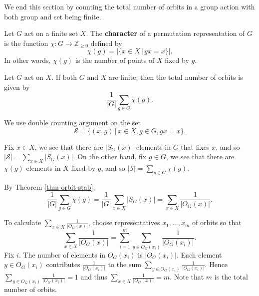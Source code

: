 We end this section by counting the total number of orbits in a group action with both group and set being finite.
\begin{definition}
	Let $G$ act on a finite set $X$. The \textbf{character} of a permutation representation of $G$ is the function $\chi:G\rightarrow \mathbb{Z}_{\geq 0}$ defined by
	\begin{equation*}
		\chi(g) = |\{x\in X\,|\, gx = x\}|.
	\end{equation*}
	In other words, $\chi(g)$ is the number of points of $X$ fixed by $g$.
\end{definition}
\begin{theorem} \label{thm-burnside-lemma}
	Let $G$ act on $X$. If both $G$ and $X$ are finite, then the total number of orbits is given by
	\begin{equation*}
		\frac{1}{|G|}\sum_{g\in G}\chi(g).
	\end{equation*}
\end{theorem}
\begin{sketch}
	We use double counting argument on the set 
	$$\mathcal{S} = \{(x,g)\,|\, x\in X,g\in G,gx = x\}.$$
	
	Fix $x\in X$, we see that there are $|S_G(x)|$ elements in $G$ that fixes $x$, and so $|\mathcal{S}| = \sum_{x\in X}|S_G(x)|$. On the other hand, fix $g\in G$, we see that there are $\chi(g)$ elements in $X$ fixed by $g$, and so 
	$|\mathcal{S}| = \sum_{g\in G}\chi(g)$.
	
	By Theorem \ref{thm-orbit-stab}, 
	\begin{equation*}
		\frac{1}{|G|} \sum_{g\in G}\chi(g) = \frac{1}{|G|} \sum_{x\in X}|S_G(x)| =  \sum_{x\in X} \frac{1}{|O_G(x)|}.
	\end{equation*}
	
To calculate $ \sum_{x\in X} \frac{1}{|O_G(x)|}$, choose representatives $x_1,\dots, x_m$ of orbits so that
\begin{equation*}
	\sum_{x\in X} \frac{1}{|O_G(x)|} = \sum_{i=1}^m\sum_{y\in O_G(x_i)} \frac{1}{|O_G(x_i)|}.
\end{equation*} Fix $i$. The number of elements in $O_G(x_i)$ is $|O_G(x_i)|$. Each element $y\in O_G(x_i)$ contributes $\frac{1}{|O_G(x_i)|}$ to the sum $\sum_{y\in O_G(x_i)} \frac{1}{|O_G(x_i)|}$. Hence $\sum_{y\in O_G(x_i)} \frac{1}{|O_G(x_i)|} = 1$ and thus $\sum_{x\in X} \frac{1}{|O_G(x)|} = m$. Note that $m$ is the total number of orbits.
\end{sketch}

